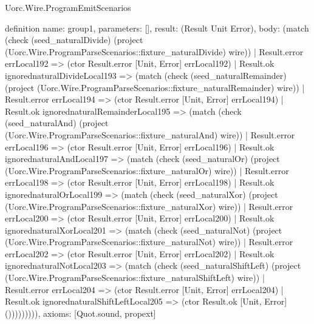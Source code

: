 \begin{lexlean}{Uorc.Wire.ProgramEmitScenarios}
\begin{semanticmodule}
definition{
  name: group1,
  parameters: [],
  result: (Result Unit Error),
  body: (match (check (seed_naturalDivide) (project (Uorc.Wire.ProgramParseScenarios::fixture_naturalDivide) wire))
    | Result.error errLocal192 => (ctor Result.error [Unit, Error] errLocal192)
    | Result.ok ignorednaturalDivideLocal193 => (match (check (seed_naturalRemainder) (project (Uorc.Wire.ProgramParseScenarios::fixture_naturalRemainder) wire))
      | Result.error errLocal194 => (ctor Result.error [Unit, Error] errLocal194)
      | Result.ok ignorednaturalRemainderLocal195 => (match (check (seed_naturalAnd) (project (Uorc.Wire.ProgramParseScenarios::fixture_naturalAnd) wire))
        | Result.error errLocal196 => (ctor Result.error [Unit, Error] errLocal196)
        | Result.ok ignorednaturalAndLocal197 => (match (check (seed_naturalOr) (project (Uorc.Wire.ProgramParseScenarios::fixture_naturalOr) wire))
          | Result.error errLocal198 => (ctor Result.error [Unit, Error] errLocal198)
          | Result.ok ignorednaturalOrLocal199 => (match (check (seed_naturalXor) (project (Uorc.Wire.ProgramParseScenarios::fixture_naturalXor) wire))
            | Result.error errLocal200 => (ctor Result.error [Unit, Error] errLocal200)
            | Result.ok ignorednaturalXorLocal201 => (match (check (seed_naturalNot) (project (Uorc.Wire.ProgramParseScenarios::fixture_naturalNot) wire))
              | Result.error errLocal202 => (ctor Result.error [Unit, Error] errLocal202)
              | Result.ok ignorednaturalNotLocal203 => (match (check (seed_naturalShiftLeft) (project (Uorc.Wire.ProgramParseScenarios::fixture_naturalShiftLeft) wire))
                | Result.error errLocal204 => (ctor Result.error [Unit, Error] errLocal204)
                | Result.ok ignorednaturalShiftLeftLocal205 => (ctor Result.ok [Unit, Error] ())))))))),
  axioms: [Quot.sound, propext]
}


\end{semanticmodule}
\end{lexlean}
